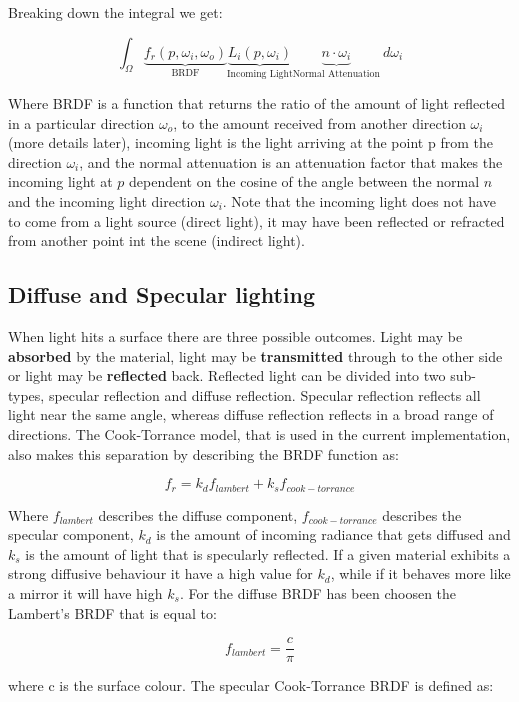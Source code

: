 \noindent Breaking down the integral we get:

\begin{equation}
\int_\Omega \underbrace{f_r(p,\omega_i,\omega_o)}_\text{BRDF}\underbrace{L_i(p,\omega_i)}_\text{Incoming Light}\underbrace{n\cdot\omega_i}_\text{Normal Attenuation}\ d\omega_i
\end{equation}

Where BRDF is a function that returns the ratio of the amount of light reflected in a particular direction $\omega_o$, to the
amount received from another direction $\omega_i$ (more details later), incoming light is the light arriving at the point p
from the direction $\omega_i$, and the normal attenuation is an attenuation factor that makes the incoming light at $p$
dependent on the cosine of the angle between the normal $n$ and the incoming light direction $\omega_i$. Note that the
incoming light does not have to come from a light source (direct light), it may have been reflected or refracted from another
point int the scene (indirect light).

\subsection{Diffuse and Specular lighting}
When light hits a surface there are three possible outcomes. Light may be \textbf{absorbed} by the material, light may be
\textbf{transmitted} through to the other side or light may be \textbf{reflected} back.
Reflected light can be divided into two sub-types, specular reflection and diffuse reflection. Specular reflection reflects
all light near the same angle, whereas diffuse reflection reflects in a broad range of directions.
The Cook-Torrance model, that is used in the current implementation, also makes this separation by describing the BRDF
function as:

$$f_r = k_d f_{lambert} + k_s f_{cook-torrance}$$

Where $f_{lambert}$ describes the diffuse component, $f_{cook-torrance}$ describes the specular component, $k_d$ is the amount
of incoming radiance that gets diffused and $k_s$ is the amount of light that is specularly reflected. If a given material
exhibits a strong diffusive behaviour it have a high value for $k_d$, while if it behaves more like a mirror it will have high $k_s$.
For the diffuse BRDF has been choosen the Lambert's BRDF that is equal to:

$$f_{lambert} = \frac{c}{\pi}$$

where c is the surface colour. The specular Cook-Torrance BRDF is defined as:

